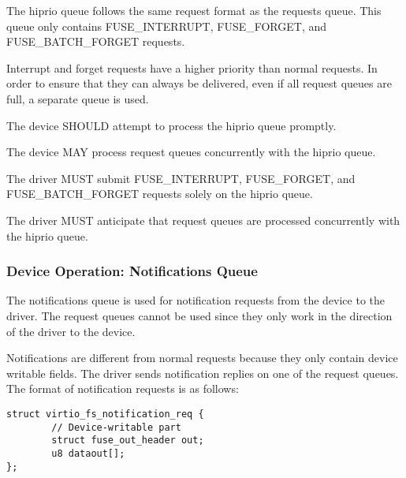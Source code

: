 The hiprio queue follows the same request format as the requests queue.  This
queue only contains FUSE_INTERRUPT, FUSE_FORGET, and FUSE_BATCH_FORGET
requests.

Interrupt and forget requests have a higher priority than normal requests.  In
order to ensure that they can always be delivered, even if all request queues
are full, a separate queue is used.


The device SHOULD attempt to process the hiprio queue promptly.

The device MAY process request queues concurrently with the hiprio queue.


The driver MUST submit FUSE_INTERRUPT, FUSE_FORGET, and FUSE_BATCH_FORGET requests solely on the hiprio queue.

The driver MUST anticipate that request queues are processed concurrently with the hiprio queue.

\subsubsection{Device Operation: Notifications Queue}\label{sec:Device Types / File System Device / Device Operation / Device Operation: Notifications Queue}

The notifications queue is used for notification requests from the device to
the driver.  The request queues cannot be used since they only work in the
direction of the driver to the device.

Notifications are different from normal requests because they only contain
device writable fields.  The driver sends notification replies on one of the
request queues.  The format of notification requests is as follows:

\begin{lstlisting}
struct virtio_fs_notification_req {
        // Device-writable part
        struct fuse_out_header out;
        u8 dataout[];
};
\end{lstlisting}

